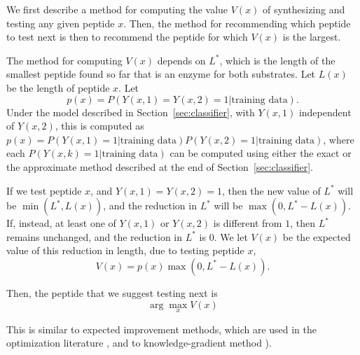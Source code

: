 \documentclass[12pt]{article}
\newcommand{\data}{\text{training data}}
\begin{document}
We first describe a method for computing the value $V(x)$ of synthesizing and testing any given peptide $x$.  Then, the method for recommending which peptide to test next is then to recommend the peptide for which $V(x)$ is the largest.

The method for computing $V(x)$ depends on $L^*$, which is the length of the smallest peptide found so far that is an enzyme for both substrates.
Let $L(x)$ be the length of peptide $x$.
Let
\begin{equation*}
  p(x) = P\left(Y(x,1)=Y(x,2)=1 | \data\right).
\end{equation*}
Under the model described in Section~\ref{sec:classifier}, with $Y(x,1)$ independent of $Y(x,2)$, this is computed as $p(x) = P\left(Y(x,1)=1 | \data\right) P\left(Y(x,2)=1 | \data\right)$, where each $P(Y(x,k)=1 | \data)$ can be computed using either the exact or the approximate method described at the end of Section~\ref{sec:classifier}.

If we test peptide $x$, and $Y(x,1)=Y(x,2)=1$, then the new value of $L^*$ will be $\min(L^*,L(x))$, and the reduction in $L^*$ will be $\max(0,L^*-L(x))$.
If, instead, at least one of $Y(x,1)$ or $Y(x,2)$ is different from $1$, then $L^*$ remains unchanged, and the reduction in $L^*$ is $0$.
We let $V(x)$ be the expected value of this reduction in length, due to testing peptide $x$,
\begin{equation*}
  V(x) = p(x)\max(0,L^*-L(x)).
\end{equation*}

Then, the peptide that we suggest testing next is
\begin{equation*}
  \arg\max_x V(x)
\end{equation*}

This is similar to expected improvement methods, which are used in the optimization literature \cite{JoScWe98},
and to knowledge-gradient method \cite{PoRy12,PoFr08}).
\end{document}
